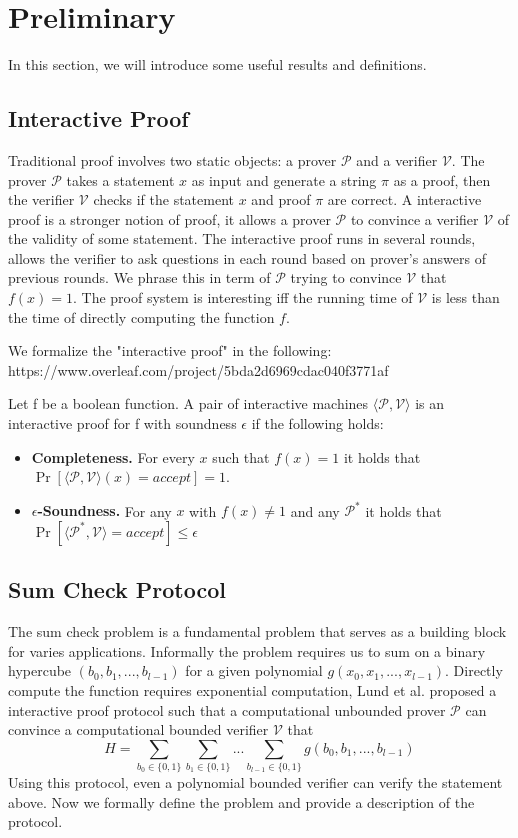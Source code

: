 \section{Preliminary}
In this section, we will introduce some useful results and definitions.
\subsection{Interactive Proof}
Traditional proof involves two static objects: a prover $\mathcal{P}$ and a verifier $\mathcal{V}$. The prover $\mathcal{P}$ takes a statement $x$ as input and generate a string $\pi$ as a proof, then the verifier $\mathcal{V}$ checks if the statement $x$ and proof $\pi$ are correct. A interactive proof is a stronger notion of proof, it allows a prover $\mathcal{P}$ to convince a verifier $\mathcal{V}$ of the validity of some statement. The interactive proof runs in several rounds, allows the verifier to ask questions in each round based on prover's answers of previous rounds. We phrase this in term of $\mathcal{P}$ trying to convince $\mathcal{V}$ that $f(x)=1$. The proof system is interesting iff the running time of $\mathcal{V}$ is less than the time of directly computing the function $f$.

We formalize the "interactive proof" in the following:
https://www.overleaf.com/project/5bda2d6969cdac040f3771af
\begin{definition}
Let f be a boolean function. A pair of interactive machines $\langle\mathcal{P}, \mathcal{V}\rangle$ is an interactive proof for f with soundness $\epsilon$ if the following holds:
\begin{itemize}
	\item {\bf Completeness.} For every $x$ such that $f(x) = 1$ it holds that $\Pr[\langle\mathcal{P}, \mathcal{V}\rangle(x)=accept]=1$.
	\item {\bf $\epsilon$-Soundness.} For any $x$ with $f(x) \neq 1$ and any $\mathcal{P}^*$ it holds that $\Pr[\langle\mathcal{P^*},\mathcal{V}\rangle=accept] \le \epsilon$
\end{itemize}
\end{definition}

\subsection{Sum Check Protocol}
The sum check problem is a fundamental problem that serves as a building block for varies applications. Informally the problem requires us to sum on a binary hypercube $(b_0, b_1, ..., b_{l-1})$ for a given polynomial $g(x_0, x_1, ..., x_{l-1})$. Directly compute the function requires exponential computation, Lund et al.\cite{sumcheck} proposed a interactive proof protocol such that a computational unbounded prover $\mathcal{P}$ can convince a computational bounded verifier $\mathcal{V}$ that $$H=\sum_{b_0\in\{0,1\}}\sum_{b_1\in\{0,1\}}...\sum_{b_{l-1}\in\{0,1\}}g(b_0,b_1,...,b_{l-1})$$
Using this protocol, even a polynomial bounded verifier can verify the statement above. Now we formally define the problem and provide a description of the protocol.

